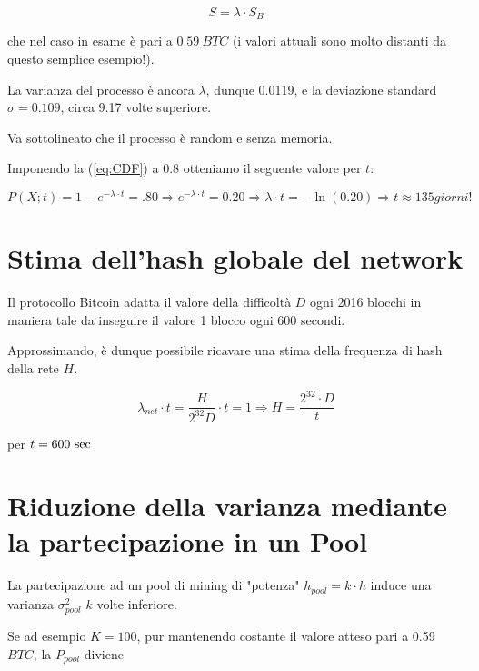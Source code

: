 \documentclass{article}
\begin{document}
\begin{equation}
    S = \lambda \cdot S_{B} \label{eq:lamdaToSubside}
\end{equation}

che nel caso in esame è pari a $0.59 \ BTC$ (i valori attuali sono molto distanti da questo semplice esempio!).

La varianza del processo è ancora $\lambda$, dunque 0.0119, e la deviazione standard $\sigma = 0.109$, circa 9.17 volte superiore.

Va sottolineato che il processo è random e senza memoria.

Imponendo la (\ref{eq:CDF}) a 0.8 otteniamo il seguente valore per $t$:

\begin{equation}
    P(X; t) = 1 - e^{-\lambda \cdot t} = .80 \Rightarrow  e^{-\lambda \cdot t} = 0.20 \Rightarrow  {\lambda \cdot t} = -\ln(0.20) \Rightarrow t \approx 135 \textit{giorni!} 
\end{equation}

\section{Stima dell'hash globale del network} \label{stima_hash_growth}

Il protocollo Bitcoin adatta il valore della difficoltà $D$ ogni 2016 blocchi in maniera tale da inseguire il valore 1 blocco ogni 600 secondi.

Approssimando, è dunque possibile ricavare una stima della frequenza di hash della rete $H$.

\begin{equation}
    \lambda_{net} \cdot t = \frac{H}{2^{32}D} \cdot t = 1 \Rightarrow H = \frac{2^{32} \cdot D}{t} \label{lamda_net}
\end{equation}

per $t = 600 \ \textnormal{sec}$

\section{Riduzione della varianza mediante la partecipazione in un Pool}

La partecipazione ad un pool di mining di "potenza" $h_{\textit{pool}} = k \cdot h$ induce una varianza $\sigma_{\textit{pool}}^{2}$ $k$ volte inferiore.

Se ad esempio $K = 100$, pur mantenendo costante il valore atteso pari a 0.59 $BTC$, la $P_{pool}$ diviene
\end{document}
